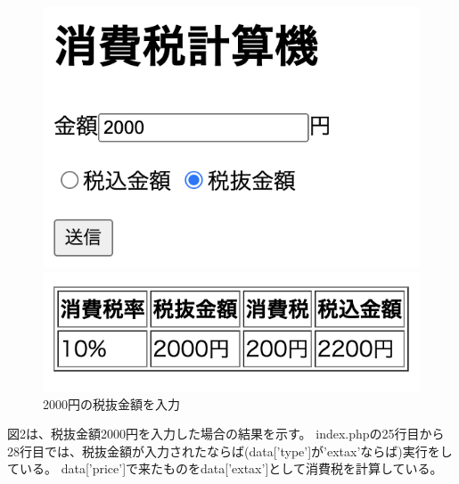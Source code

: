 \documentclass[12pt]{jarticle}
\begin{document}
\begin{figure}[h]
    \begin{minipage}{0.5\hsize}
        \begin{center}
            \includegraphics[scale=0.3]{kadai2_1_2.png}
        \end{center}
    \end{minipage}
    \begin{minipage}{0.5\hsize}
        \begin{center}
            \includegraphics[scale=0.4]{kadai2_1_3.png}
        \end{center}
    \end{minipage}
    \caption{2000円の税抜金額を入力}
\end{figure}
図2は、税抜金額2000円を入力した場合の結果を示す。
index.phpの25行目から28行目では、税抜金額が入力されたならば(data['type']が'extax'ならば)実行をしている。
data['price']で来たものをdata['extax']として消費税を計算している。
\end{document}
